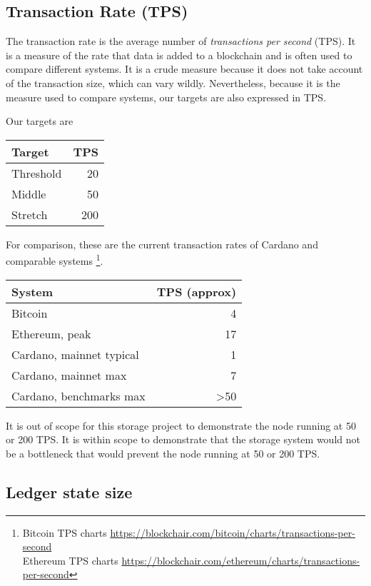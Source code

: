 \documentclass[11pt,a4paper]{article}
\begin{document}
\subsection{Transaction Rate (TPS)}
\label{requirements-tps}

The transaction rate is the average number of \emph{transactions per second}
(TPS). It is a measure of the rate that data is added to a blockchain and is
often used to compare different systems. It is a crude measure because it does
not take account of the transaction size, which can vary wildly. Nevertheless,
because it is the measure used to compare systems, our targets are also
expressed in TPS.

Our targets are

\begin{center}
\begin{tabular}[]{lr}
  Target    & TPS \\
  \toprule
  Threshold &  20 \\
  Middle    &  50 \\
  Stretch   & 200
\end{tabular}
\end{center}
%
For comparison, these are the current transaction rates of Cardano and
comparable systems%
\footnote{Bitcoin TPS charts \url{https://blockchair.com/bitcoin/charts/transactions-per-second}\\
Ethereum TPS charts \url{https://blockchair.com/ethereum/charts/transactions-per-second}}.

\begin{center}
\begin{tabular}[]{lr}
  System    & TPS (approx) \\
  \toprule
  Bitcoin                  & 4   \\
  Ethereum, peak           & 17  \\
  Cardano, mainnet typical & 1   \\
  Cardano, mainnet max     & 7   \\
  Cardano, benchmarks max  & \textgreater 50   \\
\end{tabular}
\end{center}

It is out of scope for this storage project to demonstrate the node running at
50 or 200 TPS. It is within scope to demonstrate that the storage system would
not be a bottleneck that would prevent the node running at 50 or 200 TPS.

\subsection{Ledger state size}
\label{ledger-state-size}
\end{document}
